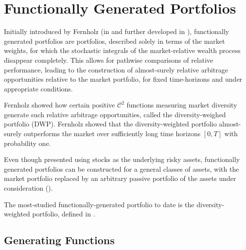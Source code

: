 \documentclass[british]{amsart}
\numberwithin{equation}{section}
\numberwithin{figure}{section}
\theoremstyle{plain}
\theoremstyle{definition}
\theoremstyle{plain}
\theoremstyle{plain}
\theoremstyle{plain}
\theoremstyle{remark}
\theoremstyle{plain}
\begin{document}
\newpage

\section{Functionally Generated Portfolios}

\newcommand{\CTwoFunction}{\mathcal{C}^2}

Initially introduced by Fernholz (in \cite{fernholz1999pgf} and further
developed in \cite{fernholz2002}), functionally generated portfolios are
portfolios, described solely in terms of the market weights, for which the
stochastic integrals of the market-relative wealth process disappear completely.
This allows for pathwise comparisons of relative performance, leading to the
construction of almost-surely relative arbitrage opportunities relative to the
market portfolio, for fixed time-horizons and under appropriate conditions.


Fernholz \cite{fernholz1999diversity} showed how certain positive
$\CTwoFunction$ functions measuring market diversity generate such relative
arbitrage opportunities, called the diversity-weighed portfolio (DWP). Fernholz
\cite{fernholz2005} showed that the diversity-weighted portfolio almost-surely
outperforms the market over sufficiently long time horizons $[0, T]$ with
probability one. 

 


Even though presented using stocks as the underlying risky assets, functionally
generated portfolios can be constructed for a general classes of assets, with
the market portfolio replaced by an arbitrary passive portfolio of the assets
under consideration (\cite{fernholz2009}).

The most-studied functionally-generated portfolio to date is the
diversity-weighted portfolio, defined in \cite{fernholz2005}. 


\newpage

\subsection{Generating Functions}
\end{document}
